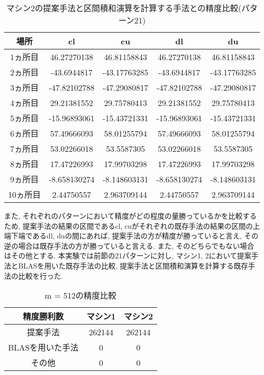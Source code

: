 \documentclass[11pt,a4paper]{jsreport}
\theoremstyle{definition}
\begin{document}
\begin{table}[H]
\centering
\begin{tabular}{|c|c|c|c|c|}
\hline
場所 & cl & cu & dl & du \\ \hline
1ヵ所目 & 46.27270138 & 46.81158843 & 46.27270138 & 46.81158843 \\ \hline
2ヵ所目 & -43.6944817 & -43.17763285 & -43.6944817 & -43.17763285 \\ \hline
3ヵ所目 & -47.82102788 & -47.29080817 & -47.82102788 & -47.29080817 \\ \hline
4ヵ所目 & 29.21381552 & 29.75780413 & 29.21381552 & 29.75780413 \\ \hline
5ヵ所目 & -15.96893061 & -15.43721331 & -15.96893061 & -15.43721331 \\ \hline
6ヵ所目 & 57.49666093 & 58.01255794 & 57.49666093 & 58.01255794 \\ \hline
7ヵ所目 & 53.02266018 & 53.5587305 & 53.02266018 & 53.5587305 \\ \hline
8ヵ所目 & 17.47226993 & 17.99703298 & 17.47226993 & 17.99703298 \\ \hline
9ヵ所目 & -8.658130274 & -8.148603131 & -8.658130274 & -8.148603131 \\ \hline
10ヵ所目 & 2.44750557 & 2.963709144 & 2.44750557 & 2.963709144 \\ \hline
\end{tabular}
\caption{マシン2の提案手法と区間積和演算を計算する手法との精度比較(パターン21)}
\end{table}


\indent また, それぞれのパターンにおいて精度がどの程度の量勝っているかを比較するため, 提案手法の結果の区間であるcl, cuがそれぞれの既存手法の結果の区間の上端下端であるdl, duの間にあれば, 提案手法の方が精度が勝っていると言え, その逆の場合は既存手法の方が勝っていると言える. また, そのどちらでもない場合はその他とする. 本実験では前節の21パターンに対し, マシン1, 2において提案手法とBLASを用いた既存手法の比較, 提案手法と区間積和演算を計算する既存手法の比較を行った.

\begin{table}[H]
\centering
\small
\caption{m = 512の精度比較}
\begin{tabular}{c|c|c}
\hline
精度勝利数 & マシン1 & マシン2 \\ \hline \hline
提案手法 & 262144 & 262144 \\ \hline
BLASを用いた手法 & 0 & 0 \\ \hline
その他 & 0 & 0 \\ \hline
\end{tabular}
\end{table}
\end{document}
